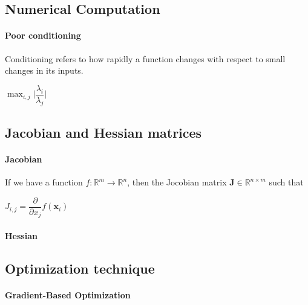 \subsection{Numerical Computation}
\paragraph{Poor conditioning}
Conditioning refers to how rapidly a function changes with respect to small changes in its inputs.
\begin{center}
    $\max_{i,j}\lvert\dfrac{\lambda_{i}}{\lambda_{j}}\rvert$
\end{center}

\subsection{Jacobian and Hessian matrices}
\paragraph{Jacobian}
If we have a function $f: \mathbb{R}^{m} \rightarrow \mathbb{R}^{n}$, then the Jocobian matrix 
$\bm{J}\in\mathbb{R}^{n\times m}$ such that 
\begin{center}
    $J_{i,j} = \dfrac{\partial}{\partial x_{j}}f(\bm{x}_{i})$
\end{center}


\paragraph{Hessian}

\subsection{Optimization technique}
\paragraph{Gradient-Based Optimization}
